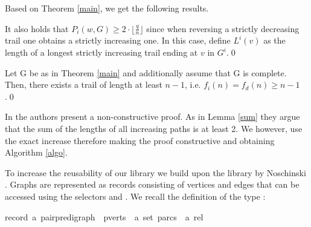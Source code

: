 \begin{isabellebody}
\begin{isamarkuptext}
\noindent Based on Theorem \ref{main}, we get the following results.

\begin{corollary}\label{corInc}
It also holds that $P_i(w,G) \ge 2\cdot\lfloor\frac{q}{n}\rfloor$ since when reversing a strictly decreasing trail 
one obtains a strictly increasing one. In this case, define $L^i(v)$ as the 
length of a longest strictly increasing trail ending at $v$ in $G^i$.\qed \end{corollary}

\begin{corollary}
Let G be as in Theorem \ref{main} and additionally assume that G is complete. Then, there exists a trail 
of length at least $n-1$, i.e. $f_i(n) = f_d(n)  \ge n-1$.\qed
\end{corollary}

In \cite{graham1973increasing} the authors present a non-constructive proof. As in Lemma \ref{sum} they argue that the 
sum of the lengths of all increasing paths is at least 2. We however, use the exact increase therefore 
making the proof constructive and obtaining Algorithm \ref{algo}.%
\end{isamarkuptext}\isamarkuptrue%
%
\isadelimdocument
%
\endisadelimdocument
%
\isatagdocument
%
\isamarkuptrue%
%
\endisatagdocument
{\isafolddocument}%
%
\isadelimdocument
%
\endisadelimdocument
%
\begin{isamarkuptext}%
\label{Formalization}%
\end{isamarkuptext}\isamarkuptrue%
%
\isadelimdocument
%
\endisadelimdocument
%
\isatagdocument
%
\isamarkuptrue%
%
\endisatagdocument
{\isafolddocument}%
%
\isadelimdocument
%
\endisadelimdocument
%
\begin{isamarkuptext}%
\label{GraphTheory} To increase the reusability of our library we build upon the 
library by Noschinski \cite{Graph_Theory-AFP}. Graphs are represented as records consisting of vertices and edges that
can be accessed using the selectors  and . We recall the definition 
of the type :

\begin{isabelle}%
record\ {\isacharprime}a\ pair{\isacharunderscore}pre{\isacharunderscore}digraph\ {\isacharequal}\ pverts\ {\isacharcolon}{\isacharcolon}\ {\isachardoublequote}{\isacharprime}a\ set{\isachardoublequote}\ parcs\ {\isacharcolon}{\isacharcolon}\ {\isachardoublequote}{\isacharprime}a\ rel{\isachardoublequote}%
\end{isabelle}


\end{isamarkuptext}
\end{isabellebody}
